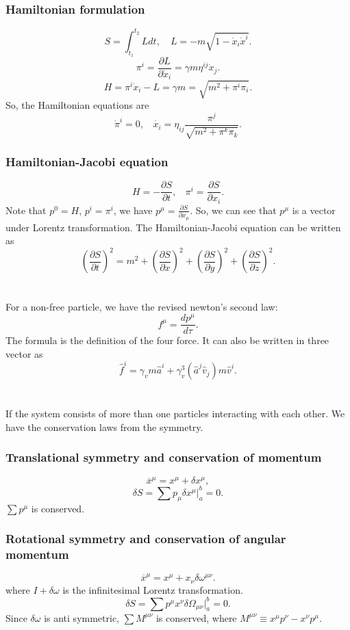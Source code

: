 \subsubsection{Hamiltonian formulation}
\[S = \int_{t_1}^{t_2} L dt , \quad L = - m \sqrt{1-\dot{x}_i\dot{x}^i}.\]
\[\pi^i = \frac{\partial L}{\partial \dot{x}_i} = \gamma m \eta^{ij}\dot{x}_j.\]
\[H = \pi^i \dot{x}_i - L = \gamma m = \sqrt{m^2 + \pi^i \pi_i}.\]
So, the Hamiltonian equations are
\[\dot{\pi}^i = 0, \ \ \ \ \dot{x_i} = \eta_{ij}\frac{\pi^j}{\sqrt{m^2 + \pi^k \pi_k}}.\]
\subsubsection{Hamiltonian-Jacobi equation}
\[H = -\frac{\partial S}{\partial t}, \ \ \ \ \pi^i = \frac{\partial S}{\partial x_i}.\]
Note that $p^0 = H$, $p^i = \pi^i$, we have $p^{\mu} = \frac{\partial S}{\partial x_{\mu}}$. So, we can see that $p^{\mu}$ is a vector under Lorentz transformation. The Hamiltonian-Jacobi equation can be written as
\[(\frac{\partial S}{\partial t})^2 = m^2 + (\frac{\partial S}{\partial x})^2 + (\frac{\partial S}{\partial y})^2 + (\frac{\partial S}{\partial z})^2.\]
\\ \\
For a non-free particle, we have the revised newton's second law:
\[f^{\mu} = \frac{dp^{\mu}}{d\tau}.\]
The formula is the definition of the four force. It can also be written in three vector as
\[\hat{f}^i = \gamma_v m \hat{a}^i + \gamma_v^3 (\hat{a}^j \hat{v}_j) m \hat{v}^i.\]
\\ \\
If the system consists of more than one particles interacting with each other. We have the conservation laws from the symmetry.
\subsubsection{Translational symmetry and conservation of momentum}
\[\overline{x}^{\mu} = x^{\mu} + \delta x^{\mu},\]
\[\delta S = \sum p_{\mu} \delta x^{\mu}|_a^b = 0 .\]
$\sum p^{\mu}$ is conserved.
\subsubsection{Rotational symmetry and conservation of angular momentum}
\[\overline{x}^{\mu} = x^{\mu} + x_{\nu}\delta \omega^{\mu \nu}.\]
where $I+\delta \omega$ is the infinitesimal Lorentz transformation.
\[\delta S = \sum p^{\mu} x^{\nu} \delta \Omega_{\mu \nu}|_a^b = 0 .\]
Since $\delta \omega$ is anti symmetric, $\sum M^{\mu \nu} $ is conserved, where $M^{\mu \nu} \equiv x^{\mu}p^{\nu} - x^{\nu}p^{\mu}$.

